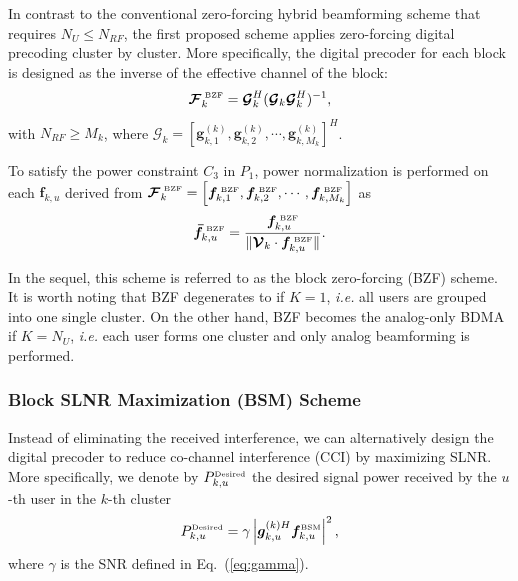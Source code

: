 \documentclass[conference]{IEEEtran}
\begin{document}
{In contrast to the conventional zero-forcing hybrid beamforming scheme \cite{el2014spatially} that requires $N_U\leq N_{RF}$, the first proposed scheme applies zero-forcing digital precoding cluster by cluster. More specifically, the digital precoder for each block is designed as the inverse of the effective channel of the block:
\begin{equation}
\bm{\mathcal{F}}^{\tiny\mbox{ BZF}}_{k} = \bm{\mathcal{G}}_k^H (\bm{\mathcal{G}}_k \bm{\mathcal{G}}_k^H)^{-1},
\label{eq:Fbzf}
\end{equation}
with $N_{RF}\geq M_k$, where $\bm{\mathcal{G}}_k = [\bm{g}^{(k)}_{k,1}, \bm{g}^{(k)}_{k,2},\cdots,\bm{g}^{(k)}_{k,M_k}]^H$.

To satisfy the power constraint $C_3$ in $P_1$, power normalization is performed on each ${\bm f}_{k,u}$ derived from $\bm{\mathcal{F}}^{\tiny\mbox{ BZF}}_{k}=\left[\bm{f}^{\tiny\mbox{ BZF}}_{k,1},\bm{f}^{\tiny\mbox{ BZF}}_{k,2},\cdots,\bm{f}^{\tiny\mbox{ BZF}}_{k,M_k}\right]$ as
\begin{equation}\label{eq:ZFU-HBF2}
\bm{\bar{f}}^{\tiny\mbox{ BZF}}_{k,u} = \frac{\bm{f}^{\tiny\mbox{ BZF}}_{k,u}}{\|\bm{\mathcal{V}}_k\cdot\bm{f}^{\tiny\mbox{ BZF}}_{k,u}\|}.
\end{equation}

In the sequel, this scheme is referred to as the block zero-forcing (BZF) scheme. It is worth noting that BZF degenerates to \cite{el2014spatially} if $K=1$, {\em i.e.} all users are grouped into one single cluster. On the other hand, BZF becomes the analog-only BDMA if $K=N_U$, {\em i.e.} each user forms one cluster and only analog beamforming is performed.


\subsubsection{Block SLNR Maximization (BSM) Scheme}
Instead of eliminating the received interference, we can alternatively design the digital precoder to reduce co-channel interference (CCI) by maximizing SLNR. More specifically, we denote by $P^{\tiny\mbox{Desired}}_{k,u}$ the desired signal power received by the $u$-th user in the $k$-th cluster
\begin{equation}
P^{\tiny\mbox{Desired}}_{k,u} = \gamma\left|\bm{g}_{k,u}^{(k)H}  \bm{f}^{\tiny\mbox{BSM}}_{k,u}\right|^2,
\end{equation}
where $\gamma$ is the SNR defined in Eq.~(\ref{eq:gamma}).

}
\end{document}
